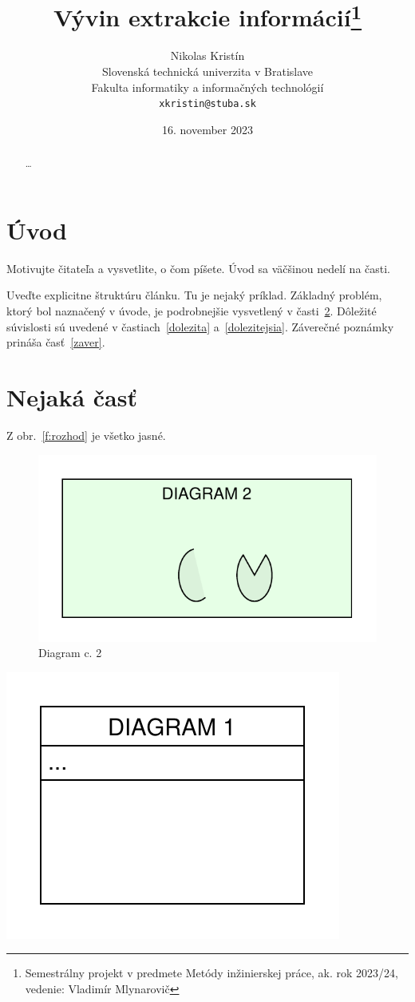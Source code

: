 \documentclass[10pt,twocolumn,slovak,a4paper]{article}
\title{Vývin extrakcie informácií\thanks{Semestrálny projekt v predmete Metódy inžinierskej práce, ak. rok 2023/24, vedenie: Vladimír Mlynarovič}}
\author{Nikolas Kristín\\[2pt]
	{\small Slovenská technická univerzita v Bratislave}\\
	{\small Fakulta informatiky a informačných technológií}\\
	{\small \texttt{xkristin@stuba.sk}}
	}
\date{\small 16. november 2023}
\begin{document}
\maketitle

\begin{abstract}
\ldots
\end{abstract}



\section{Úvod}

Motivujte čitateľa a vysvetlite, o čom píšete. Úvod sa väčšinou nedelí na časti.

Uveďte explicitne štruktúru článku. Tu je nejaký príklad.
Základný problém, ktorý bol naznačený v úvode, je podrobnejšie vysvetlený v časti~\ref{nejaka}.
Dôležité súvislosti sú uvedené v častiach~\ref{dolezita} a~\ref{dolezitejsia}.
Záverečné poznámky prináša časť~\ref{zaver}.



\section{Nejaká časť} \label{nejaka}

Z obr.~\ref{f:rozhod} je všetko jasné. 

\begin{figure}
\centering\includegraphics[angle=90, scale = 0.5]{diagram2.pdf}
\caption{Diagram c. 2}
\end{figure}


\includegraphics{diagram1.pdf}
\end{document}
